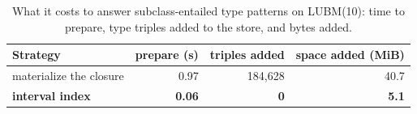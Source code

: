\begin{table}[t]
\caption{What it costs to answer subclass-entailed type patterns on LUBM(10): time to prepare, type triples added to the store, and bytes added.}
\label{tab-entail-cost}
\small
\begin{tabular}{@{}lrrr@{}}
\toprule
Strategy & prepare (s) & triples added & space added (MiB) \\
\midrule
materialize the closure & 0.97 & 184,628 & 40.7 \\
\cellcolor{ours}\textbf{interval index} & \cellcolor{ours}\textbf{0.06} & \cellcolor{ours}\textbf{0} & \cellcolor{ours}\textbf{5.1} \\
\bottomrule
\end{tabular}
\end{table}
